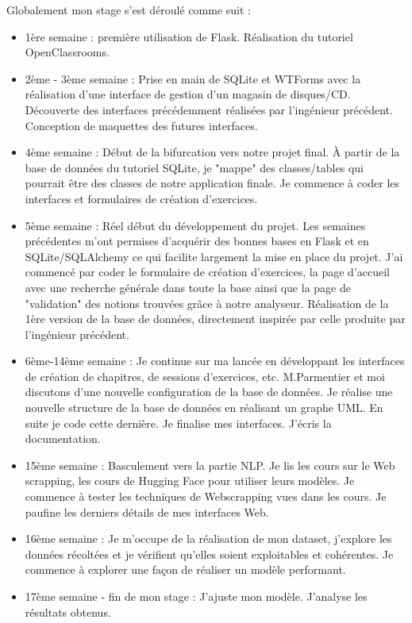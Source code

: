 \documentclass[12pt]{article}
\begin{document}
Globalement mon stage s'est déroulé comme suit :
\begin{itemize}
    \item 1ère semaine : première utilisation de Flask. Réalisation du tutoriel OpenClassrooms. 
    
    \item 2ème - 3ème semaine : Prise en main de SQLite et WTForms avec la réalisation d'une interface de gestion d'un magasin de disques/CD. Découverte des interfaces précédemment réalisées par l'ingénieur précédent. Conception de maquettes des futures interfaces.
    
    \item 4ème semaine : Début de la bifurcation vers notre projet final. À partir de la base de données du tutoriel SQLite, je "mappe" des classes/tables qui pourrait être des classes de notre application finale. Je commence à coder les interfaces et formulaires de création d'exercices.
    
    \item 5ème semaine : Réel début du développement du projet. Les semaines précédentes m'ont permises d'acquérir des bonnes bases en Flask et en SQLite/SQLAlchemy ce qui facilite largement la mise en place du projet. J'ai commencé par coder le formulaire de création d'exercices, la page d'accueil avec une recherche générale dans toute la base ainsi que la page de "validation" des notions trouvées grâce à notre analyseur. Réalisation de la 1ère version de la base de données, directement inspirée par celle produite par l'ingénieur précédent.
    
    \item 6ème-14ème semaine : Je continue sur ma lancée en développant les interfaces de création de chapitres, de sessions d'exercices, etc. M.Parmentier et moi discutons d'une nouvelle configuration de la base de données. Je réalise une nouvelle structure de la base de données en réalisant un graphe UML. En suite je code cette dernière. Je finalise mes interfaces. J'écris la documentation.
    
    \item 15ème semaine : Basculement vers la partie NLP. Je lis les cours sur le Web scrapping, les cours de Hugging Face pour utiliser leurs modèles. Je commence à tester les techniques de Webscrapping vues dans les cours. Je paufine les derniers détails de mes interfaces Web.
    
    \item 16ème semaine : Je m'occupe de la réalisation de mon dataset, j'explore les données récoltées et je vérifient qu'elles soient exploitables et cohérentes. Je commence à explorer une façon de réaliser un modèle performant.
    
    \item 17ème semaine - fin de mon stage : J'ajuste mon modèle. J'analyse les résultats obtenus. 

\end{itemize}
\end{document}
